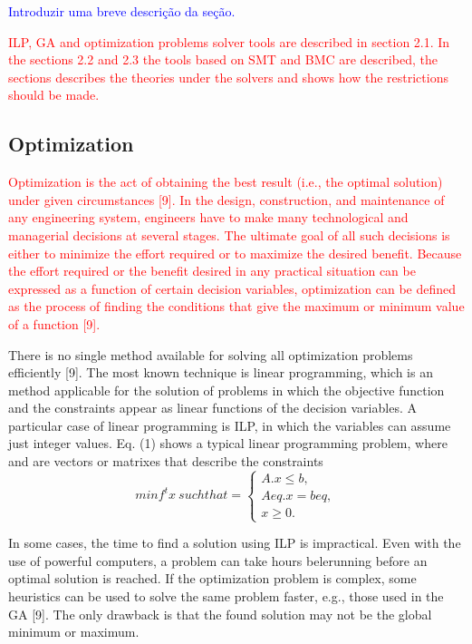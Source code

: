 \textcolor{blue}{Introduzir uma breve descrição da seção.}

\textcolor{red}{ILP, GA and optimization problems solver tools are described in section 2.1. In the sections 2.2 and 2.3 the tools based on SMT and BMC are described, the sections describes the theories under the solvers and shows how the restrictions should be made.}
\subsection{Optimization}
\textcolor{red}{Optimization is the act of obtaining the best result (i.e., the optimal solution) under given circumstances [9]. In the design, construction, and maintenance of any engineering system, engineers have to make many technological and managerial decisions at several stages. The ultimate goal of all such decisions is either to minimize the effort required or to maximize the desired benefit. Because the effort required or the benefit desired in any practical situation can be expressed as a function of certain decision variables, optimization can be defined as the process of finding the conditions that give the maximum or minimum value of a function [9].}

There is no single method available for solving all optimization problems efficiently [9]. The most known technique is linear programming, which is an method applicable for the solution of problems in which the objective function and the constraints appear as linear functions of the decision variables. A particular case of linear programming is ILP, in which the variables can assume just integer values. Eq. (1) shows a typical linear programming problem, where  and  are vectors or matrixes that describe the constraints
\begin{equation}
  minf^t x \: such that  = 
  \begin{cases}
    A.x \leq b, \\ 
    Aeq.x = beq, \\ 
    x \geq 0.
  \end{cases}
\end{equation}

In some cases, the time to find a solution using ILP is impractical. Even with the use of powerful computers, a problem can take hours belerunning before an optimal solution is reached. If the optimization problem is complex, some heuristics can be used to solve the same problem faster, e.g., those used in the GA [9]. The only drawback is that the found solution may not be the global minimum or maximum.


